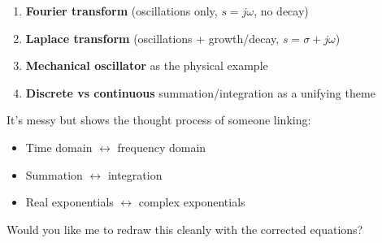 \documentclass[UTF8,a4paper,11pt]{ctexart}
\begin{document}
\begin{enumerate}
  \item \textbf{Fourier transform} (oscillations only, $s = j\omega$, no decay)
  \item \textbf{Laplace transform} (oscillations + growth/decay, $s = \sigma + j\omega$)
  \item \textbf{Mechanical oscillator} as the physical example
  \item \textbf{Discrete vs continuous} summation/integration as a unifying theme
\end{enumerate}

It's messy but shows the thought process of someone linking:
\begin{itemize}
  \item Time domain $\leftrightarrow$ frequency domain
  \item Summation $\leftrightarrow$ integration
  \item Real exponentials $\leftrightarrow$ complex exponentials
\end{itemize}

Would you like me to redraw this cleanly with the corrected equations?
\end{document}
